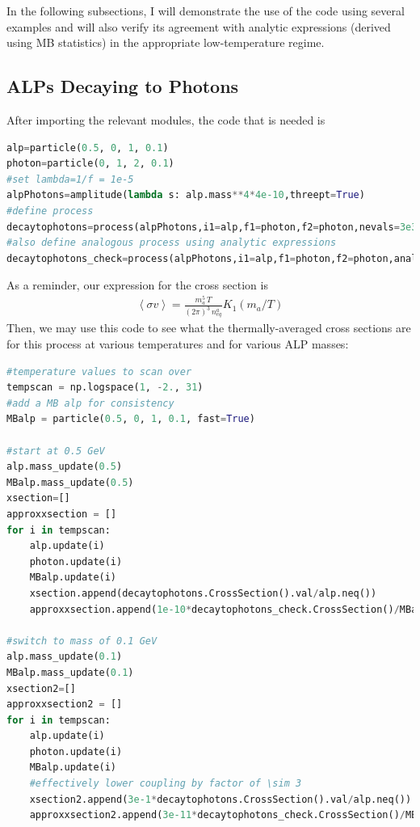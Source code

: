 \documentclass[superscriptaddress,nofootinbib,notitlepage,onecolumn]{revtex4-1}
\newcommand{\beq}{\begin{eqnarray}}
\newcommand{\eeq}{\end{eqnarray}}
\begin{document}
In the following subsections, I will demonstrate the use of the code using several examples and will also verify its agreement with analytic expressions (derived using MB statistics) in the appropriate low-temperature regime.

\subsection{ALPs Decaying to Photons}
After importing the relevant modules, the code that is needed is 
\begin{lstlisting}[language=Python]
alp=particle(0.5, 0, 1, 0.1)
photon=particle(0, 1, 2, 0.1)
#set lambda=1/f = 1e-5
alpPhotons=amplitude(lambda s: alp.mass**4*4e-10,threept=True)
#define process
decaytophotons=process(alpPhotons,i1=alp,f1=photon,f2=photon,nevals=3e3)
#also define analogous process using analytic expressions
decaytophotons_check=process(alpPhotons,i1=alp,f1=photon,f2=photon,analytic=True)
\end{lstlisting}
As a reminder, our expression for the cross section is 
\beq \left<\sigma v\right> = \frac{m_a^5\, T}{(2 \pi)^3\, n^a_{eq}} K_1(m_a/T)\eeq
Then, we may use this code to see what the thermally-averaged cross sections are for this process at various temperatures and for various ALP masses:
\begin{lstlisting}[language=Python]
#temperature values to scan over
tempscan = np.logspace(1, -2., 31)
#add a MB alp for consistency
MBalp = particle(0.5, 0, 1, 0.1, fast=True)

#start at 0.5 GeV
alp.mass_update(0.5)
MBalp.mass_update(0.5)
xsection=[]
approxxsection = []
for i in tempscan:
    alp.update(i)
    photon.update(i)
    MBalp.update(i)
    xsection.append(decaytophotons.CrossSection().val/alp.neq())
    approxxsection.append(1e-10*decaytophotons_check.CrossSection()/MBalp.neq())
    
#switch to mass of 0.1 GeV    
alp.mass_update(0.1)
MBalp.mass_update(0.1)
xsection2=[]
approxxsection2 = []
for i in tempscan:
    alp.update(i)
    photon.update(i)
    MBalp.update(i)
    #effectively lower coupling by factor of \sim 3
    xsection2.append(3e-1*decaytophotons.CrossSection().val/alp.neq())
    approxxsection2.append(3e-11*decaytophotons_check.CrossSection()/MBalp.neq())
\end{lstlisting}
\end{document}
